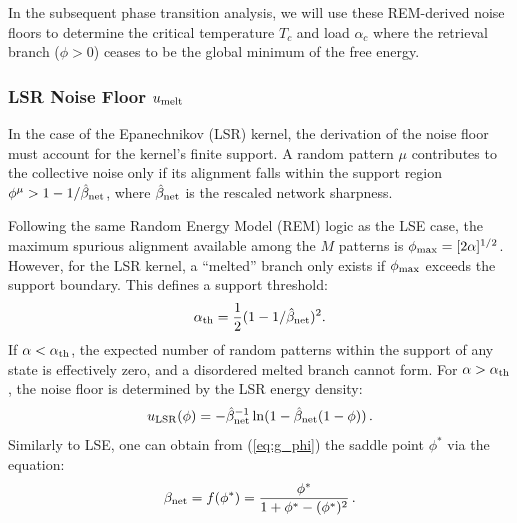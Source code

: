 \documentclass{article}
\theoremstyle{plain}
\theoremstyle{definition}
\theoremstyle{remark}
\begin{document}
In the subsequent phase transition analysis, we will use these REM-derived noise floors to determine the critical temperature $T_c$ and load $\alpha_c$ where the retrieval branch ($\phi > 0$) ceases to be the global minimum of the free energy.

\subsubsection{LSR Noise Floor $u_{\rm melt}$}

In the case of the Epanechnikov (LSR) kernel, the derivation of the noise floor must account for the kernel's finite support. A random pattern $\mu$ contributes to the collective noise only if its alignment falls within the support region $\phi^\mu > 1 - 1/\hat\beta_{\rm net}$, where $\hat\beta_{\rm net}$ is the rescaled network sharpness.

Following the same Random Energy Model (REM) logic as the LSE case, the maximum spurious alignment available among the $M$ patterns is $\phi_{\rm max} = [2\alpha]^{1/2}$. However, for the LSR kernel, a ``melted'' branch only exists if $\phi_{\rm max}$ exceeds the support boundary. This defines a support threshold:
\begin{equation}
    \alpha_{\rm th} = \frac{1}{2} (1 - 1/\hat\beta_{\rm net})^2 .
    \label{eq:alpha_th}
\end{equation}
If $\alpha < \alpha_{\rm th}$, the expected number of random patterns within the support of any state is effectively zero, and a disordered melted branch cannot form. For $\alpha > \alpha_{\rm th}$, the noise floor is determined by the LSR energy density:
\begin{equation}
    u_{\rm LSR}(\phi) = -\hat\beta_{\rm net}^{-1} \ln ( 1 - \hat\beta_{\rm net}(1 - \phi) )\,.
\end{equation}
Similarly to LSE, one can obtain from (\ref{eq:g_phi}) the saddle point $\phi^*$ via the equation:
\begin{equation}
    \beta_{\rm net} = f(\phi^*) = \frac{\phi^*}{1 + \phi^* - (\phi^*)^2}\,.
\end{equation}
\end{document}
